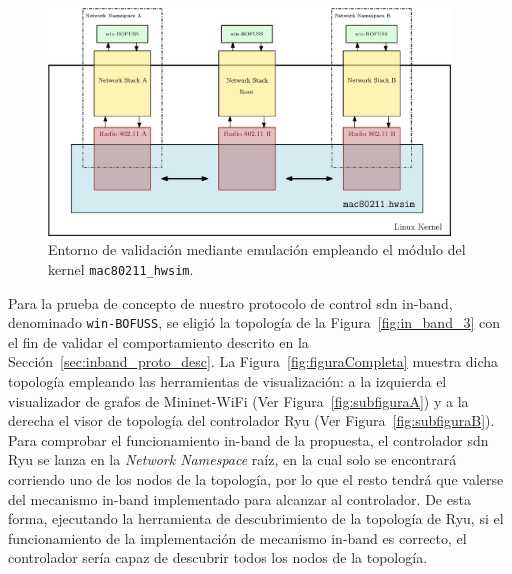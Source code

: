 \begin{figure}[ht!]
    \centering
    \includegraphics[width=0.95\textwidth]{fig/04_in-band/in_band_7.eps}
    \caption{Entorno de validación mediante emulación empleando el módulo del kernel \texttt{mac80211\_hwsim}.} 
    \label{fig:in_band_7}
\end{figure}

Para la prueba de concepto de nuestro protocolo de control \gls{sdn} in-band, denominado \texttt{win-BOFUSS}, se eligió la topología de la Figura~\ref{fig:in_band_3} con el fin de validar el comportamiento descrito en la Sección~\ref{sec:inband_proto_desc}. La Figura~\ref{fig:figuraCompleta} muestra dicha topología empleando las herramientas de visualización: a la izquierda el visualizador de grafos de Mininet-WiFi (Ver Figura~\ref{fig:subfiguraA}) y a la derecha el visor de topología del controlador Ryu (Ver Figura~\ref{fig:subfiguraB}). Para comprobar el funcionamiento in-band de la propuesta, el controlador \gls{sdn} Ryu se lanza en la \textit{Network Namespace} raíz, en la cual solo se encontrará corriendo uno de los nodos de la topología, por lo que el resto tendrá que valerse del mecanismo in-band implementado para alcanzar al controlador. De esta forma, ejecutando la herramienta de descubrimiento de la topología de Ryu, si el funcionamiento de la implementación de mecanismo in-band es correcto, el controlador sería capaz de descubrir todos los nodos de la topología. 

